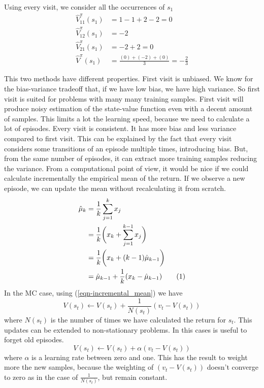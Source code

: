 \documentclass[main.tex]{subfiles}
\newcommand\numberthis{\addtocounter{equation}{1}\tag{\theequation}}
\begin{document}
Using every visit, we consider all the occurrences of $s_1$
\begin{align*}
    \hat{V}^{\pi}_{11}(s_1) &= 1 -1 +2 -2 = 0 \\
    \hat{V}^{\pi}_{12}(s_1) &= -2 \\
    \hat{V}^{\pi}_{21}(s_1) &= -2 + 2 = 0 \\
    \hat{V}^{\pi}(s_1) &= \frac{(0) + (-2) + (0)}{3} = -\frac{2}{3}
\end{align*}
\newline
\par
\noindent
This two methods have different properties. First visit is unbiased. We know for the bias-variance tradeoff that, if we have low bias, we have high variance. So first visit is suited for problems with many many training samples. First visit will produce noisy estimation of the state-value function even with a decent amount of samples. This limits a lot the learning speed, because we need to calculate a lot of episodes. Every visit is consistent\footnotemark {}. It has more bias and less variance compared to first visit. This can be explained by the fact that every visit considers some transitions of an episode multiple times, introducing bias. But, from the same number of episodes, it can extract more training samples reducing the variance.
From a computational point of view, it would be nice if we could calculate incrementally the empirical mean of the return. If we observe a new episode, we can update the mean without recalculating it from scratch.
\newpage
\begin{align*}
    \hat{\mu}_k &= \frac{1}{k} \sum_{j=1}^k x_j \\
    &=\frac{1}{k} \bigg( x_k + \sum_{j=1}^{k-1} x_j \bigg) \\
    &=\frac{1}{k} \bigg( x_k + (k-1) \hat{\mu}_{k-1} \bigg) \\
    &=\hat{\mu}_{k-1} + \frac{1}{k}(x_k - \hat{\mu}_{k-1}) \numberthis \label{eqn-incremental_mean}
\end{align*}
In the MC case, using (\ref{eqn-incremental_mean}) we have
\begin{equation}
    V(s_t) \leftarrow V(s_t) + \frac{1}{N(s_t)}(v_t-V(s_t))
\end{equation}
where $N(s_t)$ is the number of times we have calculated the return for $s_t$.
This updates can be extended to non-stationary problems. In this cases is useful to forget old episodes.
\begin{equation}
    V(s_t) \leftarrow V(s_t) + \alpha(v_t-V(s_t))
\end{equation}
where $\alpha$ is a learning rate between zero and one. This has the result to weight more the new samples, because the weighting of $(v_t-V(s_t))$ doesn't converge to zero as in the case of $\frac{1}{N(s_t)}$, but remain constant.
\end{document}
